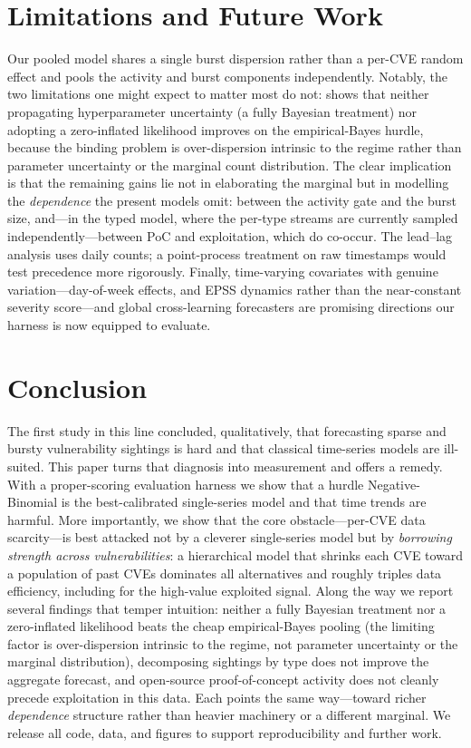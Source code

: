 \documentclass[]{article}
\begin{document}
\section{Limitations and Future Work}\label{sec:future}
Our pooled model shares a single burst dispersion rather than a per-CVE random
effect and pools the activity and burst components independently. Notably, the two
limitations one might expect to matter most do not:  shows that
neither propagating hyperparameter uncertainty (a fully Bayesian treatment) nor
adopting a zero-inflated likelihood improves on the empirical-Bayes hurdle, because
the binding problem is over-dispersion intrinsic to the regime rather than
parameter uncertainty or the marginal count distribution. The clear implication is
that the remaining gains lie not in elaborating the marginal but in modelling the
\emph{dependence} the present models omit: between the activity gate and the burst
size, and---in the typed model, where the per-type streams are currently sampled
independently---between PoC and exploitation, which do co-occur.
The lead--lag analysis uses daily counts; a point-process treatment on raw
timestamps would test precedence more rigorously. Finally, time-varying covariates
with genuine variation---day-of-week effects, and EPSS
\cite{jacobs2023enhancingvulnerabilityprioritizationdatadriven} dynamics rather
than the near-constant severity score---and global cross-learning forecasters
\cite{salinas2020deepar} are promising directions our harness is now equipped to
evaluate.

\section{Conclusion}
The first study in this line concluded, qualitatively, that forecasting sparse and
bursty vulnerability sightings is hard and that classical time-series models are
ill-suited. This paper turns that diagnosis into measurement and offers a remedy.
With a proper-scoring evaluation harness we show that a hurdle Negative-Binomial is
the best-calibrated single-series model and that time trends are harmful. More
importantly, we show that the core obstacle---per-CVE data scarcity---is best
attacked not by a cleverer single-series model but by \emph{borrowing strength
across vulnerabilities}: a hierarchical model that shrinks each CVE toward a
population of past CVEs dominates all alternatives and roughly triples data
efficiency, including for the high-value exploited signal. Along the way we report
several findings that temper intuition: neither a fully Bayesian treatment nor a
zero-inflated likelihood beats the cheap empirical-Bayes pooling (the limiting
factor is over-dispersion intrinsic to the regime, not parameter uncertainty or
the marginal distribution), decomposing sightings by type does not improve the
aggregate forecast, and open-source proof-of-concept activity does not cleanly
precede exploitation in this data. Each points the same way---toward richer
\emph{dependence} structure rather than heavier machinery or a different marginal.
We release all code, data, and figures to support reproducibility and further work.
\end{document}
